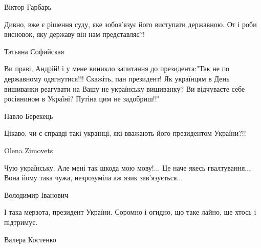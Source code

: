Віктор Гарбарь

Дивно, вже є рішення суду, яке зобов’язує його виступати державною. От і роби
висновок, яку державу він нам представляє?!

Татьяна Софийская

Ви праві, Андрій! і у мене виникло запитання до президента:"Так не по
державному одягнутися!!! Скажіть, пан президент! Як українцям в День
вишиванки реагувати на Вашу не українську вишиванку? Ви відчуваєте себе
росіянином в Україні? Путіна цим не задобриш!!"

Павло Берекець

Цікаво, чи є справді такі українці, які вважають його президентом України?!!

Olena Zimovets

Чую українську. Але мені так шкода мою мову!... Це наче якесь гвалтування...
Вона йому така чужа, незрозуміла аж язик зав'язується...

Володимир Іванович

І така мерзота, президент України. Соромно і огидно, що таке лайно, ще хтось і
підтримує.

Валера Костенко

